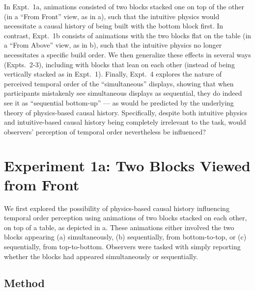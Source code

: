 In Expt.~1a, animations consisted of two blocks stacked one on top of the other (in a “From Front” view, as in a), such that the intuitive physics would necessitate a causal history of being built with the bottom block first.  In contrast, Expt.~1b consists of animations with the two blocks flat on the table (in a “From Above” view, as in b), such that the intuitive physics no longer necessitates a specific build order.  We then generalize these effects in several ways (Expts.~2-3), including with blocks that lean on each other (instead of being vertically stacked as in Expt.~1). Finally, Expt.~4 explores the nature of perceived temporal order of the “simultaneous” displays, showing that when participants mistakenly see simultaneous displays as sequential, they do indeed see it as “sequential bottom-up” --- as would be predicted by the underlying theory of physics-based causal history. Specifically, despite both intuitive physics and intuitive-based causal history being completely irrelevant to the task, would observers' perception of temporal order nevertheless be influenced? 

\section{Experiment 1a: Two Blocks Viewed from Front}

We first explored the possibility of physics-based causal history influencing temporal order perception using animations of two blocks stacked on each other, on top of a table, as depicted in a.  These animations either involved the two blocks appearing (a) simultaneously, (b) sequentially, from bottom-to-top, or (c) sequentially, from top-to-bottom.  Observers were tasked with simply reporting whether the blocks had appeared simultaneously or sequentially.

\subsection{Method}
